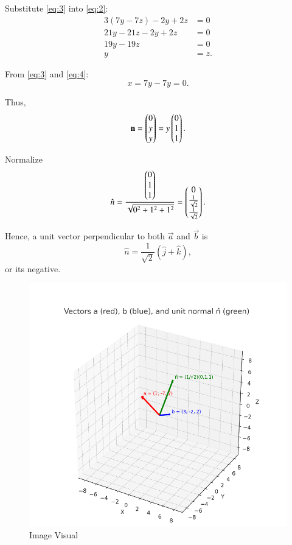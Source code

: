 \documentclass[journal]{IEEEtran}
\begin{document}
Substitute \eqref{eq:3} into \eqref{eq:2}:
\begin{align}
3(7y - 7z) - 2y + 2z &= 0 \\
21y - 21z - 2y + 2z &= 0 \\
19y - 19z &= 0 \\
y &= z. \label{eq:4}
\end{align}

From \eqref{eq:3} and \eqref{eq:4}:
\begin{equation}
x = 7y - 7y = 0.
\end{equation}

Thus,
\begin{equation}
\mathbf{n} = \begin{pmatrix}0 \\ y \\ y\end{pmatrix} = y \begin{pmatrix}0 \\ 1 \\ 1\end{pmatrix}.
\end{equation}

Normalize
\begin{equation}
\hat{n} = \frac{\begin{pmatrix}0 \\ 1 \\ 1\end{pmatrix}}{\sqrt{0^2 + 1^2 + 1^2}}
= \begin{pmatrix}0 \\ \tfrac{1}{\sqrt{2}} \\ \tfrac{1}{\sqrt{2}}\end{pmatrix}.
\end{equation}

Hence, a unit vector perpendicular to both $\vec{a}$ and $\vec{b}$ is
\begin{equation}
\hat{n} = \frac{1}{\sqrt{2}}(\hat{j} + \hat{k}),
\end{equation}
or its negative.
\begin{figure}[H]
    \centering
    \includegraphics[width=0.75\columnwidth]{figs/image.png}
    \caption{Image Visual}
    \label{fig:figs/image.png}
\end{figure}
  
\end{document}

